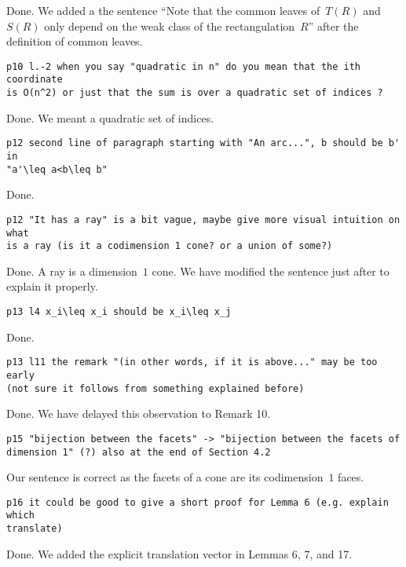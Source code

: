 \documentclass{article}
\begin{document}
Done. We added a the sentence ``Note that the common leaves of~$T(R)$ and~$S(R)$ only depend on the weak class of the rectangulation~$R$'' after the definition of common leaves.

\begin{verbatim}
p10 l.-2 when you say "quadratic in n" do you mean that the ith coordinate 
is O(n^2) or just that the sum is over a quadratic set of indices ?
\end{verbatim}

Done. We meant a quadratic set of indices.

\begin{verbatim}
p12 second line of paragraph starting with "An arc...", b should be b' in 
"a'\leq a<b\leq b" 
\end{verbatim}

Done.

\begin{verbatim}
p12 "It has a ray" is a bit vague, maybe give more visual intuition on what 
is a ray (is it a codimension 1 cone? or a union of some?)
\end{verbatim}

Done. A ray is a dimension~$1$ cone. We have modified the sentence just after to explain it properly.

\begin{verbatim}
p13 l4 x_i\leq x_i should be x_i\leq x_j
\end{verbatim}

Done.

\begin{verbatim}
p13 l11 the remark "(in other words, if it is above..." may be too early 
(not sure it follows from something explained before)
\end{verbatim}

Done. We have delayed this observation to Remark 10.

\begin{verbatim}
p15 "bijection between the facets" -> "bijection between the facets of 
dimension 1" (?) also at the end of Section 4.2
\end{verbatim}

Our sentence is correct as the facets of a cone are its codimension~$1$ faces.

\begin{verbatim}
p16 it could be good to give a short proof for Lemma 6 (e.g. explain which 
translate)
\end{verbatim}

Done. We added the explicit translation vector in Lemmas 6, 7, and 17.
\end{document}
